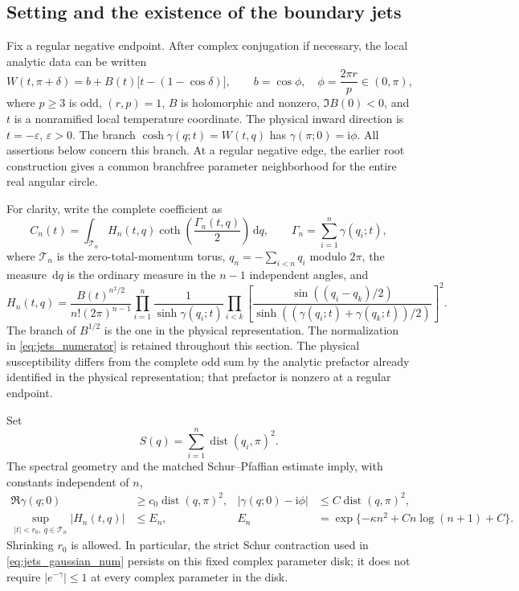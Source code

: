 \documentclass[11pt]{article}
\numberwithin{equation}{section}
\theoremstyle{definition}
\newcommand{\dd}{\,\mathrm d}
\newcommand{\ii}{\mathrm i}
\newcommand{\eps}{\varepsilon}
\newcommand{\dist}{\operatorname{dist}}
\begin{document}
\subsection{Setting and the existence of the boundary jets}

Fix a regular negative endpoint. After complex conjugation if necessary,
the local analytic data can be written
\begin{equation}\label{eq:jets_setting}
 W(t,\pi+\delta)=b+B(t)\bigl[t-(1-\cos\delta)\bigr],\qquad
 b=\cos\phi,\quad \phi=\frac{2\pi r}{p}\in(0,\pi),
\end{equation}
where $p\ge3$ is odd, $(r,p)=1$, $B$ is holomorphic and nonzero,
$\Im B(0)<0$, and $t$ is a nonramified local temperature coordinate.
The physical inward direction is $t=-\eps$, $\eps>0$. The branch
$\cosh\gamma(q;t)=W(t,q)$ has
$\gamma(\pi;0)=\ii\phi$. All assertions below concern this branch.
At a regular negative edge, the earlier root construction gives a common
branchfree parameter neighborhood for the entire real angular circle.

For clarity, write the complete coefficient as
\begin{equation}\label{eq:jets_full_coefficient}
 C_n(t)=\int_{\mathcal T_n}H_n(t,q)
        \coth\!\left(\frac{\Gamma_n(t,q)}2\right)\dd q,
 \qquad \Gamma_n=\sum_{i=1}^n\gamma(q_i;t),
\end{equation}
where $\mathcal T_n$ is the zero-total-momentum torus,
$q_n=-\sum_{i<n}q_i$ modulo $2\pi$, the measure $\dd q$ is the
ordinary measure in the $n-1$ independent angles, and
\begin{equation}\label{eq:jets_numerator}
 H_n(t,q)=\frac{B(t)^{n^2/2}}{n!(2\pi)^{n-1}}
 \prod_{i=1}^n\frac1{\sinh\gamma(q_i;t)}
 \prod_{i<k}\left[
  \frac{\sin((q_i-q_k)/2)}
       {\sinh((\gamma(q_i;t)+\gamma(q_k;t))/2)}
 \right]^2.
\end{equation}
The branch of $B^{1/2}$ is the one in the physical representation. The
normalization in \eqref{eq:jets_numerator} is retained throughout this
section. The physical susceptibility differs from the complete odd sum
by the analytic prefactor already identified in the physical
representation; that prefactor is nonzero at a regular endpoint.

Set
\[
 S(q)=\sum_{i=1}^n\dist(q_i,\pi)^2.
\]
The spectral geometry and the matched Schur--Pfaffian estimate imply,
with constants independent of $n$,
\begin{align}
 \Re\gamma(q;0)&\ge c_0\dist(q,\pi)^2,
 &|\gamma(q;0)-\ii\phi|&\le C\dist(q,\pi)^2,\label{eq:jets_attenuation0}\\
 \sup_{|t|<r_0,\ q\in\mathcal T_n}|H_n(t,q)|
 &\le E_n,
 &E_n&=\exp\{-\kappa n^2+C n\log(n+1)+C\}.
 \label{eq:jets_gaussian_num}
\end{align}
Shrinking $r_0$ is allowed. In particular, the strict Schur contraction
used in \eqref{eq:jets_gaussian_num} persists on this fixed complex
parameter disk; it does not require $|e^{-\gamma}|\le1$ at every
complex parameter in the disk.
\end{document}
